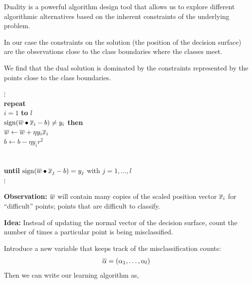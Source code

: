 \documentclass[a4paper,blends,pdf,colorBG,slideColor]{prosper}
\begin{document}
Duality is a powerful algorithm design tool that allows us to explore different algorithmic alternatives
based on the inherent constraints of the underlying problem.  

In our case the constraints on the solution (the position of the decision surface) are the observations
close to the class boundaries where the classes meet.

We find that the dual solution is dominated by the constraints represented by the points close to the class boundaries.
\es

\begin{center}
\begin{minipage}{3in}
{\small
$\vdots$\\
{\bf repeat}\\
 $i = 1$ {\bf to} $l$\\
\mytab{} {\color{red}$\sign(\ol{w}\bullet\ol{x}_i - b) \neq y_i$} {\bf then}\\
{\color{red}\mytab\mytab\mytab $\overline{w} \leftarrow \overline{w} + \eta y_i \overline{x}_i$}\\
\mytab\mytab\mytab $b \leftarrow b - \eta y_i r^2$\\
\mytab{}\\
\\
{\bf until} $\sign(\ol{w}\bullet\ol{x}_j - b) = y_j$ {\rm with} $j = 1,\ldots,l$\\
$\vdots$
}
\end{minipage}
\end{center}

\vspace{.2in}
{\bf Observation:}  $\overline{w}$ will contain many copies of the scaled position vector $\overline{x}_i$ for ``difficult'' points;  points that are difficult to classify.

{\bf Idea:} Instead of updating the normal vector of the decision surface, count the number
of times a particular point is being misclassified.

\es

Introduce a new variable that keeps track of the misclassification counts:
\[
\overline{\alpha} = (\alpha_1, \ldots,\alpha_l)
\]
Then we can write our learning algorithm as,
\end{document}
